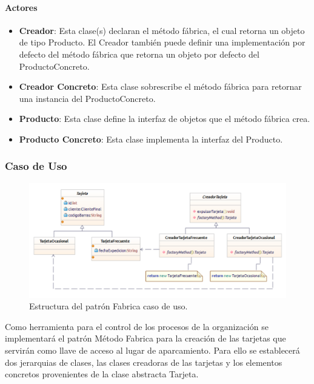 \paragraph{Actores}

\begin{itemize}
	\item \textbf{Creador}: Esta clase(s) declaran el método fábrica, el cual retorna un objeto de tipo Producto. El Creador también puede definir una implementación por defecto del método fábrica que retorna un objeto por defecto del ProductoConcreto.
	\item \textbf{Creador Concreto}: Esta clase sobrescribe el método fábrica para retornar una instancia del ProductoConcreto.
	\item \textbf{Producto}: Esta clase define la interfaz de objetos que el método fábrica crea.
	\item \textbf{Producto Concreto}: Esta clase implementa la interfaz del Producto.	
\end{itemize}

\subsubsection{Caso de Uso}

\begin{figure}[th!]
	\centering
	\includegraphics[width=.7\linewidth]{imagenes/Patrones/Builder_caso.pdf}
	\caption{Estructura del patrón Fabrica caso de uso.\cite{gof}}	
\end{figure}

Como herramienta para el control de los procesos de la organización se implementará el patrón Método Fabrica para la creación de las tarjetas que servirán como llave de acceso al lugar de aparcamiento. Para ello se establecerá dos jerarquias de clases, las clases creadoras de las tarjetas y los elementos concretos provenientes de la clase abstracta Tarjeta.



